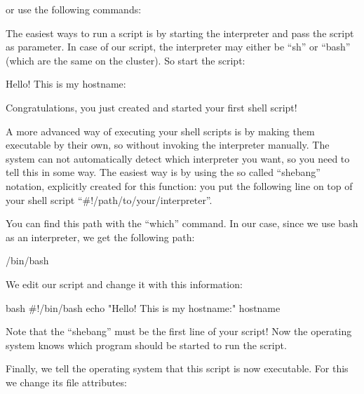 \ifgent
\begin{prompt}
\end{prompt}
\else
\begin{prompt}
\end{prompt}
\fi

or use the following commands:

\begin{prompt}
\end{prompt}

The easiest ways to run a script is by starting the interpreter and pass the
script as parameter. In case of our script, the interpreter may either be ``sh''
or ``bash'' (which are the same on the cluster). So start the script:

\begin{prompt}
Hello! This is my hostname:
\end{prompt}

Congratulations, you just created and started your first shell script!

A more advanced way of executing your shell scripts is by making them
executable by their own, so without invoking the interpreter manually. The
system can not automatically detect which interpreter you want, so you need to
tell this in some way. The easiest way is by using the so called
``shebang'' notation, explicitly created for this function: you put the
following line on top of your shell script ``\#!/path/to/your/interpreter''.

You can find this path with the ``which'' command. In our case, since we use bash
as an interpreter, we get the following path:

\begin{prompt}
/bin/bash
\end{prompt}

We edit our script and change it with this information:

\begin{code}{bash}
#!/bin/bash
echo "Hello! This is my hostname:"
hostname
\end{code}

Note that the ``shebang'' must be the first line of your script! Now the
operating system knows which program should be started to run the script.

Finally, we tell the operating system that this script is now executable. For
this we change its file attributes:

